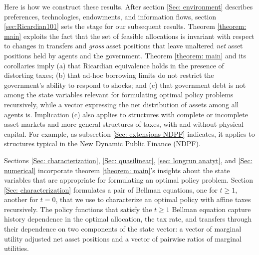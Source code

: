 \documentclass[thmsb,11pt]{article}
\begin{document}
Here is how we construct these results.
After section \ref{Sec: environment} describes preferences, technologies, endowments, and
information flows, section
\ref{sec:Ricardian101} sets the stage for our subsequent results. Theorem \ref{theorem: main}
exploits the fact that the set of feasible allocations is invariant with respect to changes in transfers and \emph{gross} asset positions that leave
unaltered  \emph{net} asset positions held by agents and the government.  Theorem \ref{theorem: main} and its corollaries imply (a) that Ricardian equivalence holds in the presence of
distorting  taxes; (b) that ad-hoc borrowing limits do not restrict the government's ability to respond to shocks; and (c) that government debt
is not among the  state variables relevant for formulating  optimal policy problems recursively, while a vector expressing the net distribution of assets among all agents is.
Implication (c) also applies to structures with complete or incomplete asset markets
and more general structures of taxes, with and without physical
capital.  For example, as subsection \ref{Sec: extensions-NDPF} indicates, it applies to structures typical in the New Dynamic Public Finance
(NDPF).


Sections \ref{Sec: characterization}, \ref{Sec: quasilinear}, \ref{sec: longrun anatyt}, and \ref{Sec: numerical}
 incorporate theorem \ref{theorem: main}'s insights about the state variables that are appropriate  for formulating an optimal policy
problem.  Section \ref{Sec: characterization} formulates a pair of Bellman equations, one for $t\geq 1$, another for $t=0$, that
we use to characterize an optimal policy with affine taxes recursively. The policy functions that satisfy the  $t\geq 1$ Bellman equation capture history dependence in the optimal allocation,
the tax rate, and transfers through their dependence on two components of the state vector:  a vector of marginal utility adjusted net asset positions and a vector of pairwise ratios of marginal utilities.
\end{document}

